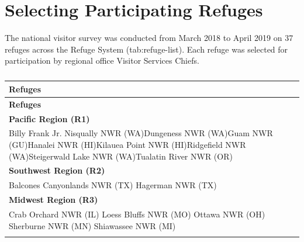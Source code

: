 \documentclass[]{book}
\begin{document}
\section*{Selecting Participating
Refuges}\label{selecting-participating-refuges}

The national visitor survey was conducted from March 2018 to April 2019
on 37 refuges across the Refuge System (tab:refuge-list). Each refuge
was selected for participation by regional office Visitor Services
Chiefs.

\begin{longtable}[]{@{}l@{}}
\caption{\label{tab:refuge-list}}\tabularnewline
\toprule
\begin{minipage}[b]{0.05\columnwidth}\raggedright\strut
\textbf{Refuges}\strut
\end{minipage}\tabularnewline
\midrule
\endfirsthead
\toprule
\begin{minipage}[b]{0.05\columnwidth}\raggedright\strut
\textbf{Refuges}\strut
\end{minipage}\tabularnewline
\midrule
\endhead
\begin{minipage}[t]{0.05\columnwidth}\raggedright\strut
\textbf{Pacific Region (R1)}\strut
\end{minipage}\tabularnewline
\begin{minipage}[t]{0.05\columnwidth}\raggedright\strut
Billy Frank Jr. Nisqually NWR (WA)Dungeness NWR (WA)Guam NWR (GU)Hanalei
NWR (HI)Kilauea Point NWR (HI)Ridgefield NWR (WA)Steigerwald Lake NWR
(WA)Tualatin River NWR (OR)\strut
\end{minipage}\tabularnewline
\begin{minipage}[t]{0.05\columnwidth}\raggedright\strut
\textbf{Southwest Region (R2)}\strut
\end{minipage}\tabularnewline
\begin{minipage}[t]{0.05\columnwidth}\raggedright\strut
Balcones Canyonlands NWR (TX) Hagerman NWR (TX)\strut
\end{minipage}\tabularnewline
\begin{minipage}[t]{0.05\columnwidth}\raggedright\strut
\textbf{Midwest Region (R3)}\strut
\end{minipage}\tabularnewline
\begin{minipage}[t]{0.05\columnwidth}\raggedright\strut
Crab Orchard NWR (IL) Loess Bluffs NWR (MO) Ottawa NWR (OH) Sherburne
NWR (MN) Shiawassee NWR (MI)\strut
\end{minipage}\tabularnewline
\begin{minipage}[t]{0.05\columnwidth}\raggedright\strut

\end{minipage}
\end{longtable}
\end{document}

